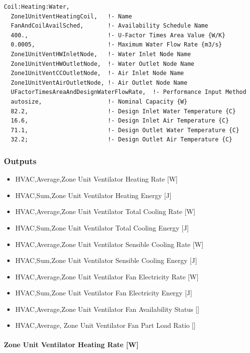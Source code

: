 \begin{lstlisting}
Coil:Heating:Water,
  Zone1UnitVentHeatingCoil,   !- Name
  FanAndCoilAvailSched,       !- Availability Schedule Name
  400.,                       !- U-Factor Times Area Value {W/K}
  0.0005,                     !- Maximum Water Flow Rate {m3/s}
  Zone1UnitVentHWInletNode,   !- Water Inlet Node Name
  Zone1UnitVentHWOutletNode,  !- Water Outlet Node Name
  Zone1UnitVentCCOutletNode,  !- Air Inlet Node Name
  Zone1UnitVentAirOutletNode, !- Air Outlet Node Name
  UFactorTimesAreaAndDesignWaterFlowRate,  !- Performance Input Method
  autosize,                   !- Nominal Capacity {W}
  82.2,                       !- Design Inlet Water Temperature {C}
  16.6,                       !- Design Inlet Air Temperature {C}
  71.1,                       !- Design Outlet Water Temperature {C}
  32.2;                       !- Design Outlet Air Temperature {C}
\end{lstlisting}

\subsubsection{Outputs}\label{outputs-2-028}

\begin{itemize}
\item
  HVAC,Average,Zone Unit Ventilator Heating Rate {[}W{]}
\item
  HVAC,Sum,Zone Unit Ventilator Heating Energy {[}J{]}
\item
  HVAC,Average,Zone Unit Ventilator Total Cooling Rate {[}W{]}
\item
  HVAC,Sum,Zone Unit Ventilator Total Cooling Energy {[}J{]}
\item
  HVAC,Average,Zone Unit Ventilator Sensible Cooling Rate {[}W{]}
\item
  HVAC,Sum,Zone Unit Ventilator Sensible Cooling Energy {[}J{]}
\item
  HVAC,Average,Zone Unit Ventilator Fan Electricity Rate {[}W{]}
\item
  HVAC,Sum,Zone Unit Ventilator Fan Electricity Energy {[}J{]}
\item
  HVAC,Average,Zone Unit Ventilator Fan Availability Status {[]}
\item
  HVAC,Average, Zone Unit Ventilator Fan Part Load Ratio {[]}
\end{itemize}

\paragraph{Zone Unit Ventilator Heating Rate {[}W{]}}\label{zone-unit-ventilator-heating-rate-w}


